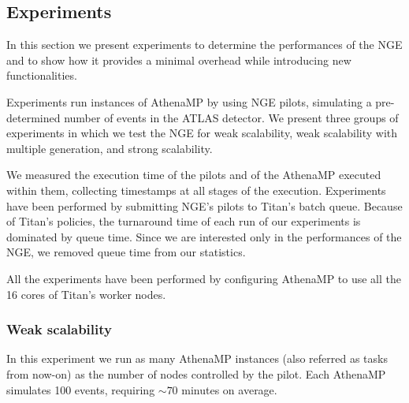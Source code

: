 
\subsection{Experiments}

In this section we present experiments %
to determine the performances of the NGE and to show how it provides a minimal
overhead while introducing new functionalities.

Experiments %
run instances of AthenaMP by using NGE pilots, %
simulating a pre-determined number of events in the ATLAS detector.
We present three groups of experiments in which we test the NGE for weak
scalability, weak scalability with multiple generation, and strong scalability.



We %
measured the execution time of the pilots and of the AthenaMP %
executed within them, collecting timestamps at %
all stages of the execution. Experiments have been performed %
by %
submitting NGE's pilots %
to Titan's batch queue. Because of Titan's %
policies, the turnaround time of each run of our experiments is dominated by
queue time. Since we are interested only in the performances of the NGE, we
removed queue time from our statistics.

All the experiments have been performed by %
configuring AthenaMP
to use all the 16 cores %
of Titan's worker nodes.


\subsubsection{Weak scalability}

In this experiment %
we run as many AthenaMP instances (also referred as tasks from now-on) as the number of nodes controlled by the pilot. Each AthenaMP
simulates 100 events, requiring $\sim 70$ minutes on average.

